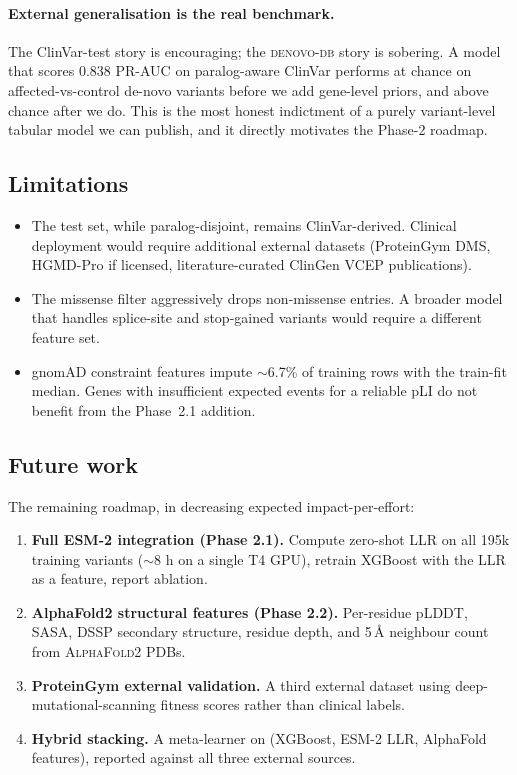 \documentclass[11pt,a4paper]{article}
\begin{document}
\paragraph{External generalisation is the real benchmark.}
The ClinVar-test story is encouraging; the \textsc{denovo-db}
story is sobering. A model that scores 0.838 PR-AUC on
paralog-aware ClinVar performs at chance on affected-vs-control
de-novo variants before we add gene-level priors, and above
chance after we do. This is the most honest indictment of a
purely variant-level tabular model we can publish, and it
directly motivates the Phase-2 roadmap.

\subsection{Limitations}

\begin{itemize}
    \item The test set, while paralog-disjoint, remains
          ClinVar-derived. Clinical deployment would require
          additional external datasets (ProteinGym DMS,
          HGMD-Pro if licensed, literature-curated ClinGen
          VCEP publications).
    \item The missense filter aggressively drops
          non-missense entries. A broader model that handles
          splice-site and stop-gained variants would require a
          different feature set.
    \item gnomAD constraint features impute \(\sim\)6.7\% of
          training rows with the train-fit median. Genes with
          insufficient expected events for a reliable pLI do
          not benefit from the Phase~2.1 addition.
\end{itemize}

\subsection{Future work}
\label{sec:future}

The remaining roadmap, in decreasing expected impact-per-effort:

\begin{enumerate}
    \item \textbf{Full ESM-2 integration (Phase 2.1).} Compute
          zero-shot LLR on all 195k training variants (\(\sim\)8 h
          on a single T4 GPU), retrain XGBoost with the LLR as a
          feature, report ablation.
    \item \textbf{AlphaFold2 structural features (Phase 2.2).}
          Per-residue pLDDT, SASA, DSSP secondary structure,
          residue depth, and 5\,\AA{} neighbour count from
          \textsc{AlphaFold2} \citep{jumper2021alphafold2} PDBs.
    \item \textbf{ProteinGym external validation.} A third
          external dataset \citep{notin2023proteingym}
          using deep-mutational-scanning fitness scores rather
          than clinical labels.
    \item \textbf{Hybrid stacking.} A meta-learner on (XGBoost,
          ESM-2 LLR, AlphaFold features), reported against all
          three external sources.
\end{enumerate}
\end{document}
